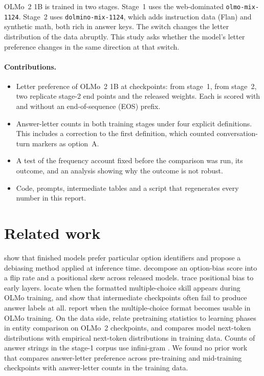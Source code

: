 \documentclass[11pt,a4paper]{article}
\begin{document}
OLMo~2 1B \citep{olmo2} is trained in two stages. Stage~1 uses the web-dominated \texttt{olmo-mix-1124}. Stage~2 uses \texttt{dolmino-mix-1124}, which adds instruction data (Flan) and synthetic math, both rich in answer keys. The switch changes the letter distribution of the data abruptly. This study asks whether the model's letter preference changes in the same direction at that switch.

\paragraph{Contributions.}
\begin{itemize}
\item Letter preference of OLMo~2 1B at \NScored{} checkpoints: \NStageOneScored{} from stage~1, \NStageTwoScored{} from stage~2, two replicate stage-2 end points and the released weights. Each is scored with and without an end-of-sequence (EOS) prefix.
\item Answer-letter counts in both training stages under four explicit definitions. This includes a correction to the first definition, which counted \MarkerCount{} conversation-turn markers as option~A.
\item A test of the frequency account fixed before the comparison was run, its outcome, and an analysis showing why the outcome is not robust.
\item Code, prompts, intermediate tables and a script that regenerates every number in this report.
\end{itemize}

\section{Related work}
\citet{zheng2024} show that finished models prefer particular option identifiers and propose a debiasing method applied at inference time. \citet{ok2026} decompose an option-bias score into a flip rate and a positional skew across released models. \citet{lee2026} trace positional bias to early layers. \citet{wiegreffe2025} locate when the formatted multiple-choice skill appears during OLMo training, and \citet{bunn2025} show that intermediate checkpoints often fail to produce answer labels at all. \citet{gu2024olmes} report when the multiple-choice format becomes usable in OLMo training. On the data side, \citet{chan2026} relate pretraining statistics to learning phases in entity comparison on OLMo~2 checkpoints, and \citet{izzo2026} compares model next-token distributions with empirical next-token distributions in training data. Counts of answer strings in the stage-1 corpus use infini-gram \citep{infinigram}. We found no prior work that compares answer-letter preference across pre-training and mid-training checkpoints with answer-letter counts in the training data.
\end{document}
